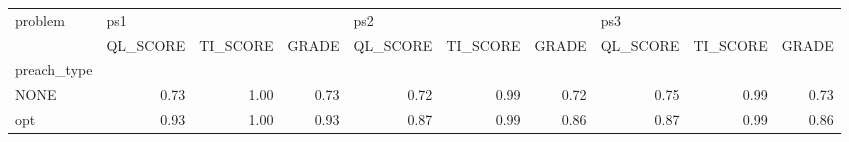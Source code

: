 \begin{tabular}{lrrrrrrrrr}
\toprule
problem & \multicolumn{3}{l}{ps1} & \multicolumn{3}{l}{ps2} & \multicolumn{3}{l}{ps3} \\
{} & QL\_SCORE & TI\_SCORE & GRADE & QL\_SCORE & TI\_SCORE & GRADE & QL\_SCORE & TI\_SCORE & GRADE \\
preach\_type &          &          &       &          &          &       &          &          &       \\
\midrule
NONE        &     0.73 &     1.00 &  0.73 &     0.72 &     0.99 &  0.72 &     0.75 &     0.99 &  0.73 \\
opt         &     0.93 &     1.00 &  0.93 &     0.87 &     0.99 &  0.86 &     0.87 &     0.99 &  0.86 \\
\bottomrule
\end{tabular}
